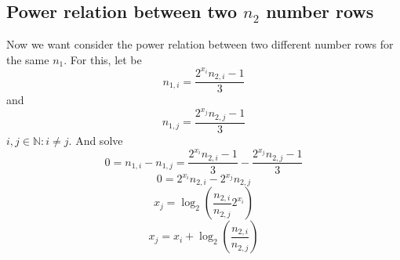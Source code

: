 \documentclass{aomart}
\theoremstyle{definition}
\begin{document}
\subsection{Power relation between two $n_{2}$ number rows}
\label{ss:powrel}
Now we want consider the power relation between two different number rows for the same $n_{1}$. For this, let be
\[ n_{1,i} = \frac{2^{x_{i}} n_{2,i} - 1}{3} \]
and
\[ n_{1,j} = \frac{2^{x_{j}} n_{2,j} - 1}{3} \]
$i,j \in \mathbb{N}: i \neq j$. And solve
\[ 0 = n_{1,i} - n_{1,j} = \frac{2^{x_{i}} n_{2,i} - 1}{3} - \frac{2^{x_{j}} n_{2,j} - 1}{3} \]
\[ 0 = 2^{x_{i}} n_{2,i} - 2^{x_{j}} n_{2,j} \]
\[ x_{j} = \log_{2}\left( \frac{n_{2,i}}{n_{2,j}} 2^{x_{i}} \right) \]
\begin{equation}\label{eq:powrel}
	x_{j} = x_{i} + \log_{2} \left( \frac{n_{2,i}}{n_{2,j}} \right)
\end{equation}
\end{document}
